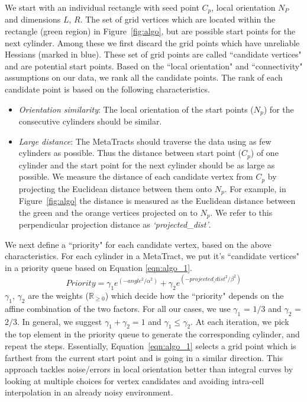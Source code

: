 We start with an individual rectangle with seed point $C_{p}$, local orientation $N_P$ and dimensions $L$, $R$. The set of grid vertices which are located within the rectangle (green region) in Figure~\ref{fig:algo}, but are possible start points for the next cylinder. Among these we first discard the grid points which have unreliable Hessians (marked in blue). These set of grid points are called ``candidate vertices" and are potential start points. Based on the ``local orientation" and ``connectivity" assumptions on our data, we rank all the candidate points. The rank of each candidate point is based on the following characteristics.
\begin{itemize}[noitemsep,nolistsep]
\item \textit{Orientation similarity}: The local orientation of the start points ($N_p$) for the consecutive cylinders should be similar. 
\item \textit{Large distance}: The MetaTracts should traverse the data using as few cylinders as possible. Thus the distance between start point ($C_p$) of one cylinder and the start point for the next cylinder should be as large as possible. We measure the distance of each candidate vertex from $C_p$ by projecting the Euclidean distance between them onto $N_p$. For example, in Figure~\ref{fig:algo} the distance is measured as the Euclidean distance between the green and the orange vertices projected on to $N_p$. We refer to this perpendicular projection distance as \textit{`projected\_dist'}. 
\end{itemize}

We next define a ``priority" for each candidate vertex, based on the above characteristics. For each cylinder in a MetaTract, we put it's ``candidate vertices" in a priority queue based on Equation \ref{eqn:algo_1}.
\begin{equation}
Priority = \gamma_1 e^{(-angle^2 / \alpha^2)} + \gamma_2e^{(-projected\_dist^2 / \beta^2)}
\label{eqn:algo_1}
\end{equation}
$\gamma_1$, $\gamma_2$ are the  weights ($\mathbb{R}_{\ge 0}$)  which decide how the ``priority" depends on the affine combination of the two factors. For all our cases, we use $\gamma_1$ = $1 / 3 $ and $\gamma_2$ = $2 / 3$. In general, we suggest $\gamma_1 +\gamma_2 = 1 $ and $\gamma_1 \leq \gamma_2$. At each iteration, we pick the top element in the priority queue to generate the corresponding cylinder, and repeat the steps. Essentially, Equation~\ref{eqn:algo_1} selects a grid point which is farthest from the current start point and is going in a similar direction. This approach tackles noise/errors in local orientation better than integral curves by looking at multiple choices for vertex candidates and avoiding intra-cell interpolation in an already noisy environment. 

